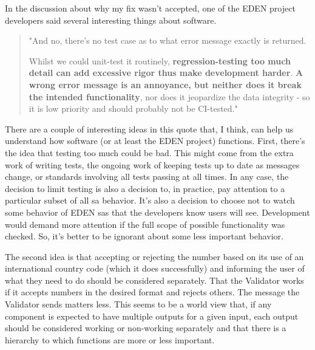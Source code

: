 \documentclass[a4paper,man,natbib,floatsintext]{apa6}
\begin{document}
   In the discussion about why my fix wasn't accepted, one of the \gls{EDEN} project developers said several interesting things about software.

   \begin{quote}
   "And no, there's no test case as to what error message exactly is returned.

   Whilst we could unit-test it routinely, \textbf{regression-testing too much detail can add excessive rigor thus make development harder}. \textbf{A wrong error message is an annoyance, but neither does it break the intended functionality}, nor does it jeopardize the data integrity - so it is low priority and should probably not be CI-tested." \citep{Konig2020-yx}
   \end{quote}

   There are a couple of interesting ideas in this quote that, I think, can help us understand how software (or at least the \gls{EDEN} project) functions. First, there's the idea that testing too much could be bad. This might come from the extra work of writing tests, the ongoing work of keeping tests up to date as messages change, or standards involving all tests passing at all times. In any case, the decision to limit testing is also a decision to, in practice, pay attention to a particular subset of all \gls{sa} behavior. It's also a decision to choose not to watch some behavior of \gls{EDEN} \glspl{sa} that the developers know users will see. Development would demand more attention if the full scope of possible functionality was checked. So, it's better to be ignorant about some less important behavior.

   The second idea is that accepting or rejecting the number based on its use of an international country code (which it does successfully) and informing the user of what they need to do should be considered separately. That the Validator works if it accepts numbers in the desired format and rejects others. The message the Validator sends matters less. This seems to be a world view that, if any component is expected to have multiple outputs for a given input, each output should be considered working or non-working separately and that there is a hierarchy to which functions are more or less important. 
   \newpage
\end{document}
